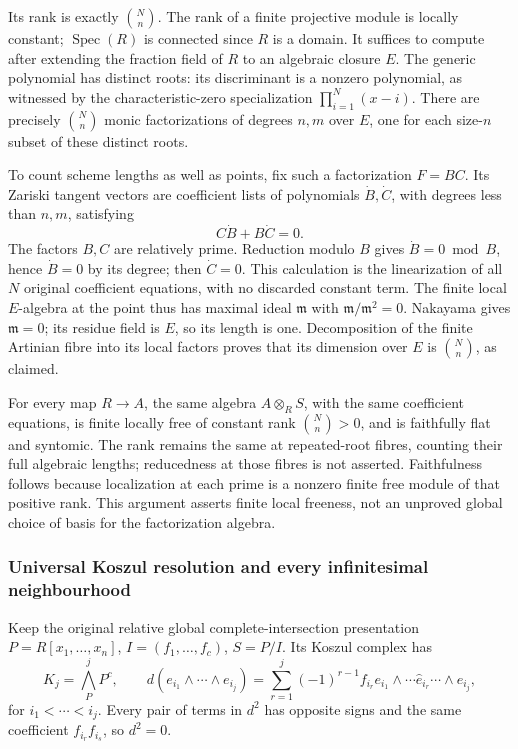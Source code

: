 Its rank is exactly \(\binom{N}{n}\). The rank of a finite projective module is locally constant; \(\operatorname{Spec}(R)\) is connected since \(R\) is a domain. It suffices to compute after extending the fraction field of \(R\) to an algebraic closure \(E\). The generic polynomial has distinct roots: its discriminant is a nonzero polynomial, as witnessed by the characteristic-zero specialization \(\prod_{i=1}^N(x-i)\). There are precisely \(\binom Nn\) monic factorizations of degrees \(n,m\) over \(E\), one for each size-\(n\) subset of these distinct roots.

To count scheme lengths as well as points, fix such a factorization \(F=BC\). Its Zariski tangent vectors are coefficient lists of polynomials \(\dot B,\dot C\), with degrees less than \(n,m\), satisfying \[
C\dot B+B\dot C=0.
\] The factors \(B,C\) are relatively prime. Reduction modulo \(B\) gives \(\dot B=0\bmod B\), hence \(\dot B=0\) by its degree; then \(\dot C=0\). This calculation is the linearization of all \(N\) original coefficient equations, with no discarded constant term. The finite local \(E\)-algebra at the point thus has maximal ideal \(\mathfrak m\) with \(\mathfrak m/\mathfrak m^2=0\). Nakayama gives \(\mathfrak m=0\); its residue field is \(E\), so its length is one. Decomposition of the finite Artinian fibre into its local factors proves that its dimension over \(E\) is \(\binom Nn\), as claimed.

For every map \(R\to A\), the same algebra \(A\otimes_R S\), with the same coefficient equations, is finite locally free of constant rank \(\binom Nn>0\), and is faithfully flat and syntomic. The rank remains the same at repeated-root fibres, counting their full algebraic lengths; reducedness at those fibres is not asserted. Faithfulness follows because localization at each prime is a nonzero finite free module of that positive rank. This argument asserts finite local freeness, not an unproved global choice of basis for the factorization algebra.

\subsubsection{Universal Koszul resolution and every infinitesimal neighbourhood}\label{universal-koszul-resolution-and-every-infinitesimal-neighbourhood}

Keep the original relative global complete-intersection presentation \(P=R[x_1,\ldots,x_n]\), \(I=(f_1,\ldots,f_c)\), \(S=P/I\). Its Koszul complex has \[
K_j=\bigwedge^j_P P^c,\qquad
d(e_{i_1}\wedge\cdots\wedge e_{i_j})
=\sum_{r=1}^j(-1)^{r-1}f_{i_r}
 e_{i_1}\wedge\cdots\widehat e_{i_r}\cdots\wedge e_{i_j},
\] for \(i_1<\cdots<i_j\). Every pair of terms in \(d^2\) has opposite signs and the same coefficient \(f_{i_r}f_{i_s}\), so \(d^2=0\).

